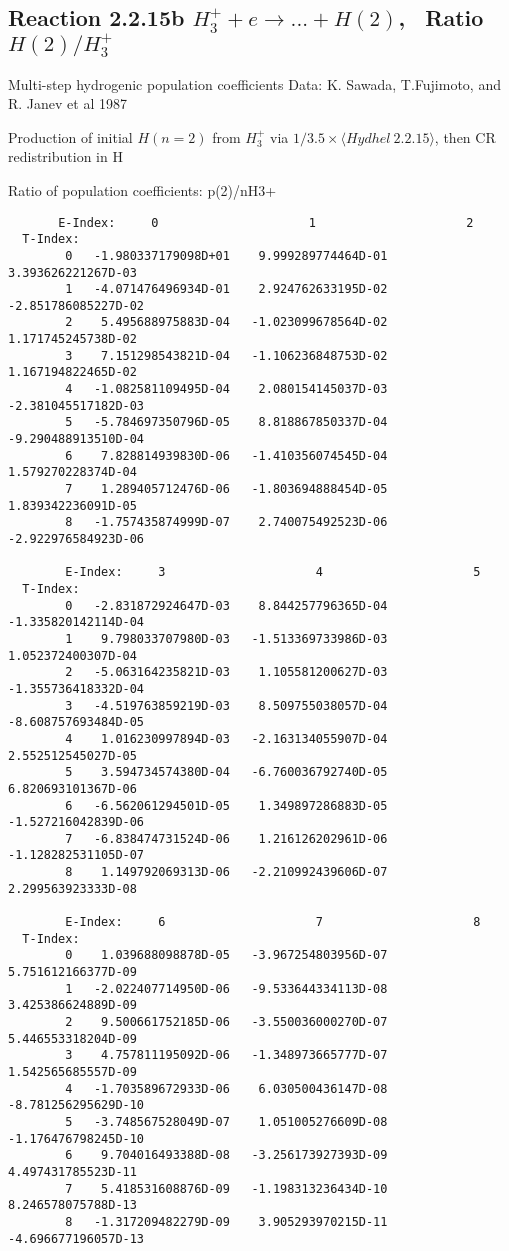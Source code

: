 \documentclass[12pt,dvipdfmx]{article}
\begin{document}
\subsection{
Reaction 2.2.15b $ H_3^+ + e \rightarrow ...+ H(2) $, \   Ratio $H(2)/H_3^+  $
}

 Multi-step hydrogenic population coefficients
 Data: K. Sawada, T.Fujimoto, \cite{kn:Sawada} and R. Janev et al 1987

 Production of initial $H(n=2)$ from $H_3^+$ via $1/3.5 \times \langle Hydhel~ 2.2.15\rangle$,
 then CR redistribution in H

 Ratio of population coefficients: p(2)/nH3+

\begin{small}\begin{verbatim}
       E-Index:     0                     1                     2
  T-Index:
        0   -1.980337179098D+01    9.999289774464D-01    3.393626221267D-03
        1   -4.071476496934D-01    2.924762633195D-02   -2.851786085227D-02
        2    5.495688975883D-04   -1.023099678564D-02    1.171745245738D-02
        3    7.151298543821D-04   -1.106236848753D-02    1.167194822465D-02
        4   -1.082581109495D-04    2.080154145037D-03   -2.381045517182D-03
        5   -5.784697350796D-05    8.818867850337D-04   -9.290488913510D-04
        6    7.828814939830D-06   -1.410356074545D-04    1.579270228374D-04
        7    1.289405712476D-06   -1.803694888454D-05    1.839342236091D-05
        8   -1.757435874999D-07    2.740075492523D-06   -2.922976584923D-06

        E-Index:     3                     4                     5
  T-Index:
        0   -2.831872924647D-03    8.844257796365D-04   -1.335820142114D-04
        1    9.798033707980D-03   -1.513369733986D-03    1.052372400307D-04
        2   -5.063164235821D-03    1.105581200627D-03   -1.355736418332D-04
        3   -4.519763859219D-03    8.509755038057D-04   -8.608757693484D-05
        4    1.016230997894D-03   -2.163134055907D-04    2.552512545027D-05
        5    3.594734574380D-04   -6.760036792740D-05    6.820693101367D-06
        6   -6.562061294501D-05    1.349897286883D-05   -1.527216042839D-06
        7   -6.838474731524D-06    1.216126202961D-06   -1.128282531105D-07
        8    1.149792069313D-06   -2.210992439606D-07    2.299563923333D-08

        E-Index:     6                     7                     8
  T-Index:
        0    1.039688098878D-05   -3.967254803956D-07    5.751612166377D-09
        1   -2.022407714950D-06   -9.533644334113D-08    3.425386624889D-09
        2    9.500661752185D-06   -3.550036000270D-07    5.446553318204D-09
        3    4.757811195092D-06   -1.348973665777D-07    1.542565685557D-09
        4   -1.703589672933D-06    6.030500436147D-08   -8.781256295629D-10
        5   -3.748567528049D-07    1.051005276609D-08   -1.176476798245D-10
        6    9.704016493388D-08   -3.256173927393D-09    4.497431785523D-11
        7    5.418531608876D-09   -1.198313236434D-10    8.246578075788D-13
        8   -1.317209482279D-09    3.905293970215D-11   -4.696677196057D-13


\end{verbatim}
\end{small}
\end{document}

